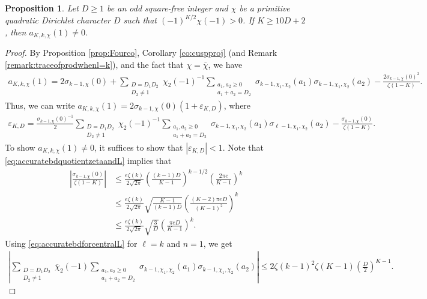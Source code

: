 \documentclass[11pt,letterpaper,reqno]{amsart}
\numberwithin{figure}{section}
\numberwithin{table}{section}
\theoremstyle{definition}
\theoremstyle{plain}
\newtheorem{proposition}[theorem]{Proposition}
\theoremstyle{definition}
\theoremstyle{definition}
\theoremstyle{remark}
\numberwithin{equation}{section}
\theoremstyle{remark}
\begin{document}
\begin{proposition}\label{prop:nonvanishingofF}  Let $D\geq1$ be an odd square-free integer and $\chi$ be a primitive quadratic Dirichlet character $D$ such that $(-1)^{K/2}\chi(-1)>0$.
 If $K\geq10D+2$, then $a_{K,k,\chi}(1)\neq0$. 
\end{proposition}
\begin{proof}
By Proposition \ref{prop:Fourco}, Corollary \ref{co:cuspproj} (and Remark \ref{remark:traceofprodwhenl=k}), and the fact that $\chi=\overline{\chi}$, we have
\begin{align*}
a_{K,k,\chi}(1)
=2\sigma_{k-1,\chi}(0)+\sum_{\substack{D=D_1D_2\\D_2\neq 1 }}\chi_2(-1)^{-1}\sum_{\substack{a_1,a_2\geq0\\a_1+a_2=D_2}}\sigma_{k-1,\chi_1,\chi_2}(a_1)\sigma_{k-1,\chi_1,\chi_2}(a_2)-\frac{2\sigma_{k-1,\chi}(0)^2}{\zeta(1-K)}.
\end{align*}
Thus, we can write $a_{K,k,\chi}(1)=2\sigma_{k-1,\chi}(0)(1+\varepsilon_{K,D})$, where
\begin{align*}
    \varepsilon_{K,D}=\frac{\sigma_{k-1,\chi}(0)^{-1}}{2}\sum_{\substack{D=D_1D_2\\D_2\neq 1 }}\chi_2(-1)^{-1}\sum_{\substack{a_1,a_2\geq0\\a_1+a_2=D_2}}\sigma_{k-1,\chi_1,\chi_2}(a_1)\sigma_{\ell-1,\chi_1,\chi_2}(a_2)-\frac{\sigma_{k-1,\chi}(0)}{\zeta(1-K)}.
\end{align*}
To show $a_{K,k,\chi}(1)\neq0$, it suffices to show that $|\varepsilon_{K,D}|<1$. 
Note that \eqref{eq:accuratebdquotientzetaandL} implies that
\begin{align}
    \left|\frac{\sigma_{k-1,\chi}(0)}{\zeta(1-K)}\right|&\leq   \frac{e\zeta(k)}{2\sqrt{2\pi}}\left(\frac{(k-1)D}{K-1}\right)^{k-1/2}\left(\frac{2\pi e}{K-1}\right)^{k}  \nonumber\\&\leq\frac{e\zeta(k)}{2\sqrt{2\pi}}\sqrt{\frac{K-1}{(k-1)D}}\left(\frac{(K-2)\pi eD}{(K-1)^2}\right)^k  \nonumber\\&\leq\frac{e\zeta(k)}{2\sqrt{2\pi}}\sqrt{\frac{3}{D}}\left(\frac{\pi e D}{K-1}\right)^k.  \label{eq:bdfor2ndterm}
\end{align}
Using \eqref{eq:accuratebdforcentralL} for $\ell=k$ and $n=1$, we get
 \begin{align}
\left|\sum_{\substack{D=D_1D_2\\D_2\neq 1 }}\overline{\chi}_2(-1)\sum_{\substack{a_1,a_2\geq0\\a_1+a_2=D_2}}\sigma_{k-1,\chi_1,\chi_2}(a_1)\sigma_{k-1,\chi_1,\chi_2}(a_2)\right|\leq2\zeta(k-1)^2\zeta(K-1)\left(\frac{D}{2}\right)^{K-1}. \label{eq:sharperbdmathfrakE}

\end{align}
\end{proof}
\end{document}
